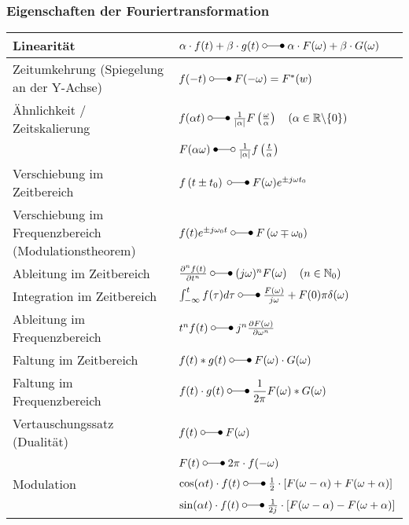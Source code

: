 \subsubsection{Eigenschaften der Fouriertransformation}
\begin{tabular}{|l|l|}
	\hline Linearität	&	$\alpha \cdot f(t)+\beta \cdot g(t) \; \laplace \; \alpha \cdot F(\omega)+\beta \cdot G(\omega)$\\
	\hline Zeitumkehrung (Spiegelung an der Y-Achse) & $f(-t) \; \laplace \; F(-\omega)=F^{*}(w)$\\ 
	\hline Ähnlichkeit / Zeitskalierung & $f(\alpha t) \; \laplace \; \frac{1}{|\alpha|} F\left(\frac{\omega}{\alpha}\right) \quad\left(\alpha \in \mathbb{R} \backslash\{0\}\right)$\\
	& $F(\alpha \omega) \; \Laplace \; \frac{1}{|\alpha|} f\left(\frac{t}{\alpha}\right)$\\
	\hline Verschiebung im Zeitbereich	& $f\left(t \pm t_{0}\right) \; \laplace \; F(\omega) e^{\pm j \omega t_{0}}$\\
	\hline Verschiebung im Frequenzbereich (Modulationstheorem)	& $f(t) e^{\pm j \omega_{0} t} \; \laplace \; F\left(\omega \mp \omega_{0}\right)$\\
	\hline Ableitung im Zeitbereich		& $\frac{\partial^{n} f(t)}{\partial t^{n}} \; \laplace \; (j \omega)^{n} F(\omega) \quad\left(n \in \mathbb{N}_{0}\right)$\\
	\hline Integration im Zeitbereich	& $\int_{-\infty}^{t} f(\tau) d \tau \; \laplace \; \frac{F(\omega)}{j \omega}+F(0) \pi \delta(\omega)$\\
	\hline Ableitung im Frequenzbereich	& $t^{n}f(t) \; \laplace \; j^{n}\frac{\partial F(\omega)}{\partial \omega^{n}}$\\
	\hline Faltung im Zeitbereich		& $f(t)*g(t) \; \laplace \; F(\omega) \cdot G(\omega)$\\
	\hline Faltung im Frequenzbereich	& $f(t) \cdot g(t) \; \laplace \; \dfrac{1}{2 \pi}F(\omega) * G(\omega)$\\
	\hline Vertauschungssatz (Dualität)	& $f(t) \; \laplace \; F(\omega)$\\
	& $F(t) \; \laplace \; 2 \pi \cdot f(-\omega)$\\
	\hline Modulation					& $\cos(\alpha t)\cdot f(t) \; \laplace \; \frac{1}{2} \cdot \left[F(\omega-\alpha)+F(\omega+\alpha)\right]$\\
	& $\sin(\alpha t)\cdot f(t) \; \laplace \; \frac{1}{2j} \cdot \left[F(\omega-\alpha)-F(\omega+\alpha)\right]$\\
	\hline
\end{tabular}
\renewcommand{\arraystretch}{1}